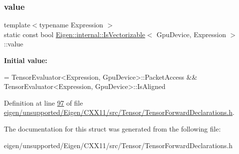 \subsubsection{\texorpdfstring{value}{value}}
{\footnotesize\ttfamily template$<$typename Expression $>$ \\
static const bool \hyperlink{struct_eigen_1_1internal_1_1_is_vectorizable}{Eigen\+::internal\+::\+Is\+Vectorizable}$<$ Gpu\+Device, Expression $>$\+::value\hspace{0.3cm}{\ttfamily [static]}}

{\bfseries Initial value\+:}
\begin{DoxyCode}
= TensorEvaluator<Expression, GpuDevice>::PacketAccess &&
                            TensorEvaluator<Expression, GpuDevice>::IsAligned
\end{DoxyCode}


Definition at line \hyperlink{eigen_2unsupported_2_eigen_2_c_x_x11_2src_2_tensor_2_tensor_forward_declarations_8h_source_l00097}{97} of file \hyperlink{eigen_2unsupported_2_eigen_2_c_x_x11_2src_2_tensor_2_tensor_forward_declarations_8h_source}{eigen/unsupported/\+Eigen/\+C\+X\+X11/src/\+Tensor/\+Tensor\+Forward\+Declarations.\+h}.



The documentation for this struct was generated from the following file\+:\begin{DoxyCompactItemize}
\item 
eigen/unsupported/\+Eigen/\+C\+X\+X11/src/\+Tensor/\+Tensor\+Forward\+Declarations.\+h\end{DoxyCompactItemize}
